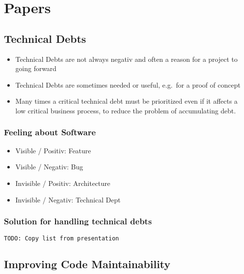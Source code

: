 \hypertarget{papers}{%
\section{Papers}\label{papers}}

\hypertarget{technical-debts}{%
\subsection{Technical Debts}\label{technical-debts}}

\begin{itemize}
\tightlist
\item
  Technical Debts are not always negativ and often a reason for a
  project to going forward
\item
  Technical Debts are sometimes needed or useful, e.g.~for a proof of
  concept
\item
  Many times a critical technical debt must be prioritized even if it
  affects a low critical business process, to reduce the problem of
  accumulating debt.
\end{itemize}

\hypertarget{feeling-about-software}{%
\subsubsection{Feeling about Software}\label{feeling-about-software}}

\begin{itemize}
\tightlist
\item
  Visible / Positiv: Feature
\item
  Visible / Negativ: Bug
\item
  Invisible / Positiv: Architecture
\item
  Invisible / Negativ: Technical Dept
\end{itemize}

\hypertarget{solution-for-handling-technical-debts}{%
\subsubsection{Solution for handling technical
debts}\label{solution-for-handling-technical-debts}}

\begin{verbatim}
TODO: Copy list from presentation
\end{verbatim}

\hypertarget{improving-code-maintainability}{%
\subsection{Improving Code
Maintainability}\label{improving-code-maintainability}}

